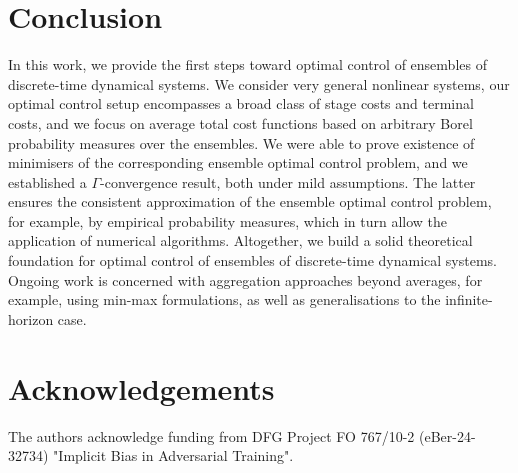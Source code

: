 \documentclass[letterpaper, 10 pt, conference]{IEEEconf}  %
\theoremstyle{theorem}
\theoremstyle{definition}
\theoremstyle{remark}
\begin{document}
\section{Conclusion} \label{sec:ecc:conclusion}
In this work, we provide the first steps toward optimal control of ensembles of discrete-time dynamical systems.
We consider very general nonlinear systems, our optimal control setup encompasses a broad class of stage costs and terminal costs, and we focus on average total cost functions based on arbitrary Borel probability measures over the ensembles.
We were able to prove existence of minimisers of the corresponding ensemble optimal control problem, and we established a $\Gamma$-convergence result, both under mild assumptions.
The latter ensures the consistent approximation of the ensemble optimal control problem, for example, by empirical probability measures, which in turn allow the application of numerical algorithms.
Altogether, we build a solid theoretical foundation for optimal control of ensembles of discrete-time dynamical systems.
Ongoing work is concerned with aggregation approaches beyond averages, for example, using min-max formulations, as well as generalisations to the infinite-horizon case.

\section*{Acknowledgements}
The authors acknowledge funding from DFG Project FO 767/10-2 (eBer-24-32734) "Implicit Bias in Adversarial Training".








 
 
\end{document}
